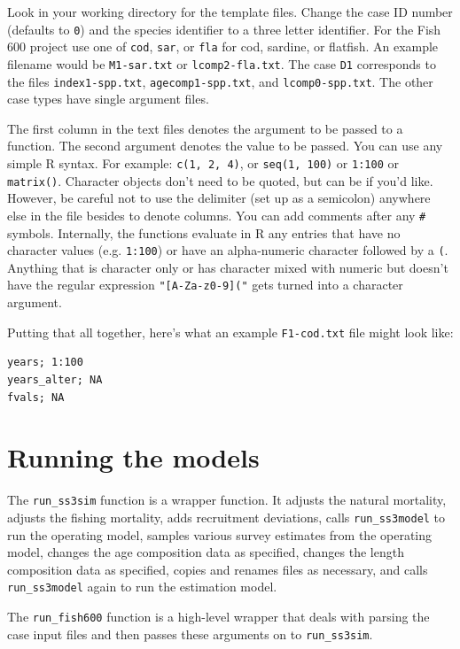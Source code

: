 \documentclass[12pt]{article}
\begin{document}
Look in your working directory for the template files. Change the case ID 
number (defaults to \texttt{0}) and the species identifier to a three letter 
identifier. For the Fish 600 project use one of \texttt{cod}, \texttt{sar}, or 
\texttt{fla} for cod, sardine, or flatfish. An example filename would be 
\texttt{M1-sar.txt} or \texttt{lcomp2-fla.txt}. The case \texttt{D1} 
corresponds to the files \texttt{index1-spp.txt}, \texttt{agecomp1-spp.txt}, 
and \texttt{lcomp0-spp.txt}. The other case types have single argument files.

The first column in the text files denotes the argument to be passed to a 
function. The second argument denotes the value to be passed. You can use any 
simple R syntax. For example: \texttt{c(1, 2, 4)}, or \texttt{seq(1, 100)} or 
\texttt{1:100} or \texttt{matrix()}. Character objects don't need to be quoted, 
but can be if you'd like. However, be careful not to use the delimiter (set up 
as a semicolon) anywhere else in the file besides to denote columns. You can 
add comments after any \texttt{\#} symbols. Internally, the functions evaluate 
in R any entries that have no character values (e.g. \texttt{1:100}) or have an 
alpha-numeric character followed by a \texttt{(}. Anything that is character 
only or has character mixed with numeric but doesn't have the regular 
expression \texttt{"[A-Za-z0-9]("} gets turned into a character argument.

Putting that all together, here's what an example \texttt{F1-cod.txt} file 
might look like:

\begin{verbatim}
years; 1:100
years_alter; NA 
fvals; NA
\end{verbatim}

\section*{Running the models}

The \texttt{run\_ss3sim} function is a wrapper function. It adjusts the natural 
mortality, adjusts the fishing mortality, adds recruitment deviations, calls 
\texttt{run\_ss3model} to run the operating model, samples various survey 
estimates from the operating model, changes the age composition data as 
specified, changes the length composition data as specified, copies and renames 
files as necessary, and calls \texttt{run\_ss3model} again to run the 
estimation model.

The \texttt{run\_fish600} function is a high-level wrapper that deals with 
parsing the case input files and then passes these arguments on to 
\texttt{run\_ss3sim}.
\end{document}
